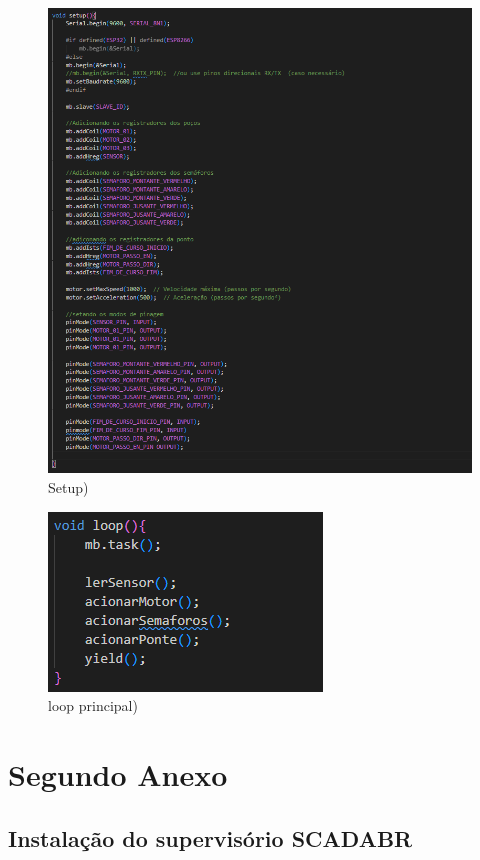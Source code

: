 \begin{anexosenv}
\begin{figure}[h]
	\centering
	\label{fig:codigo_pt04}
		\includegraphics[keepaspectratio=true,scale=0.6]{figuras/codigo_pt4.png}
	\caption{Setup)}
\end{figure}
\begin{figure}[h]
	\centering
	\label{fig:codigo_pt05}
		\includegraphics[keepaspectratio=true,scale=0.6]{figuras/codigo_pt5.png}
	\caption{loop principal)}
\end{figure}


\chapter{Segundo Anexo}

\section{Instalação do supervisório SCADABR}


\end{anexosenv}
